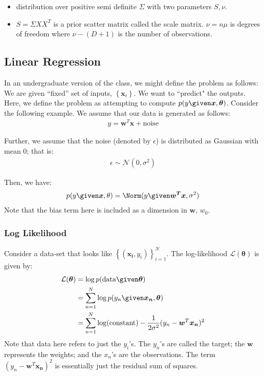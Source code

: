 \documentclass{article}
\renewcommand{\v}{\boldsymbol}
\begin{document}
\begin{itemize}
\item distribution over positive semi definite $\Sigma$ with two parameters $S,\nu$.
\item $S=\Sigma XX^T$ is a prior scatter matrix called the scale matrix. $\nu=n\mu$ is degrees of freedom where $\nu - (D+1)$ is the number of observations.
\end{itemize}

\subsection{Linear Regression}
In an undergraduate version of the class, we might define the problem as follows: We are given ``fixed'' set of inputs, $\left \{ \v{x}_i \right\}$. We want to ``predict" the outputs.
\\

\noindent Here, we define the problem as attempting to compute $p(y \given \v{x}, \v{\theta})$. Consider the following example. We assume that our data is generated as follows:
	\begin{align*}
		y = \v{w}^T \v{x} + \text{noise}
	\end{align*} 
	
\noindent Further, we assume that the noise (denoted by $\epsilon$) is distributed as Gaussian with mean $0$; that is:
	\begin{align*}
		\epsilon \sim \mathcal{N}(0, \sigma^2)
	\end{align*}
	
\noindent Then, we have:
	\begin{align*}
		p(y \given \v{x}, \theta) = \Norm (y \given \v{w^T}\v{x}, \sigma^2)
	\end{align*}
\noindent Note that the bias term here is included as a dimension in $\v{w}$, $w_0$.

\subsubsection{Log Likelihood}
Consider a data-set that looks like $\left \{ (\v{x_i}, y_i)\right\}_{i=1}^{N}$. The log-likelihood $\mathcal{L}(\v{\theta})$ is given by:
	\begin{align*}
		\mathcal{L}(\v{\theta}) &= \log p(\text{data} \given \v{\theta}) \\
							&= \sum_{n=1}^N \log p (y_n \given \v{x_n}, \v{\theta})\\
							&= \sum_{n=1}^N \log(\text{constant}) - \frac{1}{2 \sigma^2} (y_n - \v{w}^T \v{x_n})^2
	\end{align*}
	Note that data here refers to just the $y_i$'s. The $y_n$'s are called the target; the $\v{w}$ represents the weights; and the $x_n$'s are the observations. The term $(y_n - \v{w}^T \v{x_n})^2$ is essentially just the residual sum of squares.
	
\end{document}

